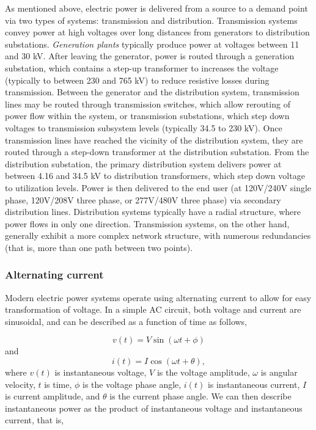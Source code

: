 As mentioned above, electric power is delivered from a source to a demand point via two types of systems:  transmission and distribution.  Transmission systems convey power at high voltages over long distances from generators to distribution substations.  \emph{Generation plants} typically produce power at voltages between 11 and 30 kV.  After leaving the generator, power is routed through a generation substation, which contains a step-up transformer to increases the voltage (typically to between 230 and 765 kV) to reduce resistive losses during transmission.  Between the generator and the distribution system, transmission lines may be routed through transmission switches, which allow rerouting of power flow within the system, or transmission substations, which step down voltages to transmission subsystem levels (typically 34.5 to 230 kV).  Once transmission lines have reached the vicinity of the distribution system, they are routed through a step-down transformer at the distribution substation.  From the distribution substation, the primary distribution system delivers power at between 4.16 and 34.5 kV to distribution transformers, which step down voltage to utilization levels. Power is then delivered to the end user (at 120V/240V single phase, 120V/208V three phase, or 277V/480V three phase) via secondary distribution lines.  Distribution systems typically have a radial structure, where power flows in only one direction.  Transmission systems, on the other hand, generally exhibit a more complex network structure, with numerous redundancies (that is, more than one path between two points).


\subsubsection{Alternating current}

Modern electric power systems operate using alternating current to allow for easy transformation of voltage.  In a simple AC circuit, both voltage and current are sinusoidal, and can be described as a function of time as follows,

\begin{equation}
v(t) = V\sin(\omega t + \phi)
\end{equation}
%
and
%
\begin{equation}
i(t) = I\cos(\omega t + \theta),
\end{equation}
%
where $v(t)$ is instantaneous voltage, $V$ is the voltage amplitude, $\omega$ is angular velocity, $t$ is time, $\phi$ is the voltage phase angle, $i(t)$ is instantaneous current, $I$ is current amplitude, and $\theta$ is the current phase angle. We can then describe instantaneous power as the product of instantaneous voltage and instantaneous current, that is,

